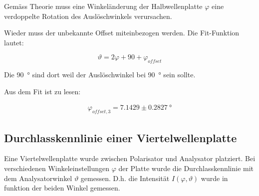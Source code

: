 Gem\"ass Theorie muss eine Winkel\"anderung der  Halbwellenplatte $\varphi$ eine
verdoppelte Rotation des Ausl\"oschwinkels verursachen.

Wieder muss der unbekannte Offset miteinbezogen werden. Die Fit-Funktion lautet:

\begin{equation}
    \vartheta = 2\varphi + 90 + \varphi_{offset}
\end{equation}

Die  \SI{90}{\degree}  sind dort weil der Ausl\"oschwinkel bei  \SI{90}{\degree}
sein sollte.

Aus dem Fit ist zu lesen:

\begin{align*}
    \varphi_{offset,3} = 7.1429 \pm 0.2827\SI{}{\degree}
\end{align*}


\subsection{Durchlasskennlinie einer Viertelwellenplatte}

Eine  Viertelwellenplatte  wurde  zwischen Polarisator und Analysator platziert.
Bei   verschiedenen   Winkeleinstellungen   $\varphi$   der  Platte  wurde   die
Durchlasskennlinie  mit  dem  Analysatorwinkel  $\vartheta$ gemessen.  D.h.  die
Intensit\"at  $I(\varphi,\vartheta)$  wurde  in  funktion   der   beiden  Winkel
gemessen.

